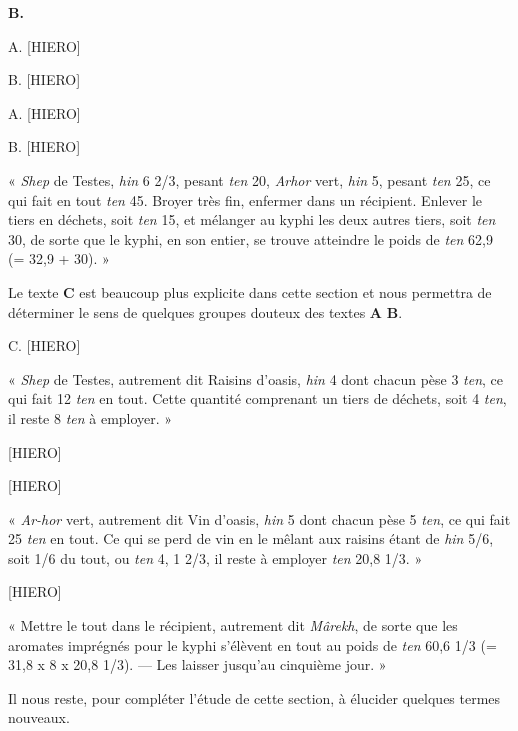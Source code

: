 \documentclass[a4paper, 11pt, oneside, landscape]{article}
\newcommand*\hieroAAFT{}
\newcommand*\hieroAAGN{}
\newcommand*\hieroAALP{}
\newcommand*\hieroAAMQ{}
\begin{document}
\hspace*{10mm}\textbf{B.}\hspace*{5mm} $\hieroAAGN\:\hieroAAFT\:\hieroAALP\:\hieroAAGN\:\hieroAAFT\:\hieroAAMQ\:\hieroAALP$

A. [HIERO]

B. [HIERO]

A. [HIERO]

B. [HIERO]

« \emph{Shep} de Testes, \emph{hin} 6 2/3, pesant \emph{ten} 20, \emph{Arhor} vert, \emph{hin} 5, pesant \emph{ten} 25, ce qui fait en tout \emph{ten} 45. Broyer très fin, enfermer dans un récipient. Enlever le tiers en déchets, soit \emph{ten} 15, et mélanger au kyphi les deux autres tiers, soit \emph{ten} 30, de sorte que le kyphi, en son entier, se trouve atteindre le poids de \emph{ten} 62,9 (= 32,9 + 30). »

Le texte \textbf{C} est beaucoup plus explicite dans cette section et nous permettra de déterminer le sens de quelques groupes douteux des textes \textbf{A} \textbf{B}.

C. [HIERO]

« \emph{Shep} de Testes, autrement dit Raisins d'oasis, \emph{hin} 4 dont chacun pèse 3 \emph{ten}, ce qui fait 12 \emph{ten} en tout. Cette quantité comprenant un tiers de déchets, soit 4 \emph{ten}, il reste 8 \emph{ten} à employer. »

[HIERO]

[HIERO]

« \emph{Ar-hor} vert, autrement dit Vin d'oasis, \emph{hin} 5 dont chacun pèse 5 \emph{ten}, ce qui fait 25 \emph{ten} en tout. Ce qui se perd de vin en le mêlant aux raisins étant de \emph{hin} 5/6, soit 1/6 du tout, ou \emph{ten} 4, 1 2/3, il reste à employer \emph{ten} 20,8 1/3. »

[HIERO]

« Mettre le tout dans le récipient, autrement dit \emph{Mârekh}, de sorte que les aromates imprégnés pour le kyphi s'élèvent en tout au poids de \emph{ten} 60,6 1/3 (= 31,8 x 8 x 20,8 1/3). --- Les laisser jusqu'au cinquième jour. »

Il nous reste, pour compléter l'étude de cette section, à élucider quelques termes nouveaux.
\end{document}

